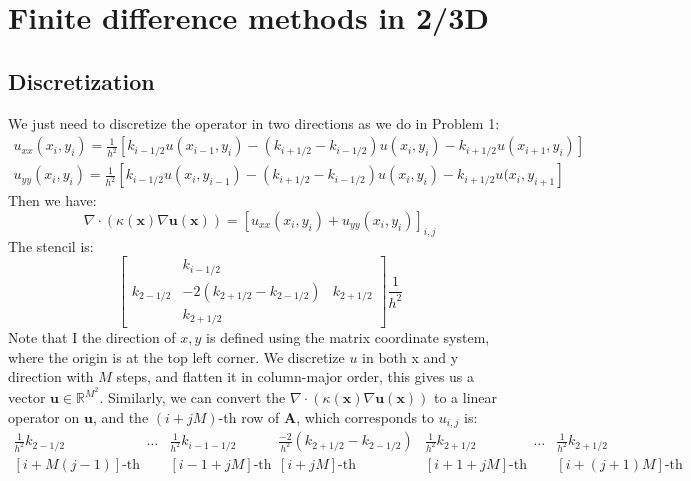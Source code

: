 \documentclass[12pt, fullpage,letterpaper]{article}
\newcommand{\bs}[1]{\boldsymbol{#1}}
\begin{document}
\section{Finite difference methods in 2/3D }
\subsection{Discretization}
We just need to discretize the operator in two directions as we do in Problem 1:
\begin{equation}
\begin{split}
u_{xx}(x_i, y_i) = \frac{1}{h^2} \left[ { k_{i-1/2}u(x_{i-1}, y_i)  - (k_{i+1/2}-k_{i-1/2})u(x_{i}, y_i) -  k_{i+1/2}u(x_{i+1}, y_i) } \right]\\
u_{yy}(x_i, y_i) = \frac{1}{h^2} \left[ {  k_{i-1/2}u(x_{i}, y_{i-1})  - (k_{i+1/2}-k_{i-1/2})u(x_{i}, y_i) -  k_{i+1/2}u(x_{i}, y_{i+1} } \right]
\end{split}
\end{equation}
Then we have:
\begin{equation}
\nabla \cdot \left(\kappa(\bs{x}) \nabla \bs{u}(\bs{x}) \right) = \left[ u_{xx}(x_i, y_i) + u_{yy}(x_i, y_i) \right]_{i, j}
\end{equation}
The stencil is:
\begin{equation}
\begin{bmatrix}
  &k_{i-1/2} &  \\
k_{2-1/2} & -2(k_{2+1/2}-k_{2-1/2}) & k_{2+1/2}  \\
  &   k_{2+1/2}  &  

\end{bmatrix}  \frac{1}{h^2}
\end{equation}
Note that I the direction of $x, y$ is defined using the matrix coordinate system, where the origin is at the top left corner. 
We discretize $u$ in both x and y direction with $M$ steps, and flatten it in column-major order, this gives us a vector $\mathbf{u} \in \mathbb{R}^{M^2}$. Similarly, we can convert the $\nabla \cdot \left(\kappa(\bs{x}) \nabla \bs{u}(\bs{x}) \right)$ to a linear operator on  $\mathbf{u}$, and the $(i + jM)$-th row of $\mathbf{A}$, which corresponds to  $u_{i,j}$ is:
\begin{equation}
\begin{matrix}
 \frac{1}{h^2}k_{2-1/2} & \dots & \frac{1}{h^2} k_{i-1-1/2} & \frac{-2}{h^2}(k_{2+1/2}-k_{2-1/2})& \frac{1}{h^2}k_{2+1/2}               & \dots &  \frac{1}{h^2}k_{2+1/2} \\
 [i + M(j-1)]\text{-th} &       &   [i-1 + jM]\text{-th}    &   [i + jM]\text{-th}   &   [i+1 + jM]\text{-th}  &       &    [i + (j+1)M]\text{-th}   
\end{matrix} 
\end{equation}
\end{document}
